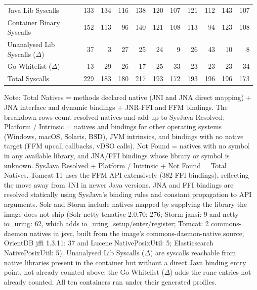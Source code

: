 \begin{table}[t]
\begin{tabular}{@{}lrrrrrrrrrr@{}}
Java Lib Syscalls & 133 & 134 & 116 & 138 & 120 & 107 & 121 & 112 & 143 & 107 \\
Container Binary Syscalls & 152 & 113 & 96 & 140 & 121 & 108 & 113 & 94 & 123 & 108 \\
Unanalysed Lib Syscalls ($\Delta$) & 37 & 3 & 27 & 25 & 24 & 9 & 26 & 43 & 10 & 8 \\
Go Whitelist ($\Delta$) & 13 & 29 & 26 & 17 & 25 & 33 & 23 & 23 & 23 & 34 \\
Total Syscalls & 229 & 183 & 180 & 217 & 193 & 172 & 193 & 196 & 196 & 173 \\
\bottomrule
\end{tabular}
\par\smallskip
\begin{minipage}{\textwidth}\footnotesize
Note: Total Natives = methods declared native (JNI and JNA direct mapping) + JNA interface and dynamic bindings + JNR-FFI and FFM bindings. The breakdown rows count resolved natives and add up to SysJava Resolved; Platform / Intrinsic = natives and bindings for other operating systems (Windows, macOS, Solaris, BSD), JVM intrinsics, and bindings with no native target (FFM upcall callbacks, vDSO calls). Not Found = natives with no symbol in any available library, and JNA/FFI bindings whose library or symbol is unknown. SysJava Resolved + Platform / Intrinsic + Not Found = Total Natives. Tomcat 11 uses the FFM API extensively (382 FFI bindings), reflecting the move away from JNI in newer Java versions. JNA and FFI bindings are resolved statically using SysJava's binding rules and constant propagation to API arguments. Solr and Storm include natives mapped by supplying the library the image does not ship (Solr netty-tcnative 2.0.70: 276; Storm jansi: 9 and netty io_uring: 62, which adds io\_uring\_setup/enter/register; Tomcat: 2 commons-daemon natives in jsvc, built from the image's commons-daemon-native source; OrientDB jffi 1.3.11: 37 and Lucene NativePosixUtil: 5; Elasticsearch NativePosixUtil: 5). Unanalysed Lib Syscalls ($\Delta$) are syscalls reachable from native libraries present in the container but without a direct Java binding entry point, not already counted above; the Go Whitelist ($\Delta$) adds the runc entries not already counted. All ten containers run under their generated profiles.
\end{minipage}
\end{table}
